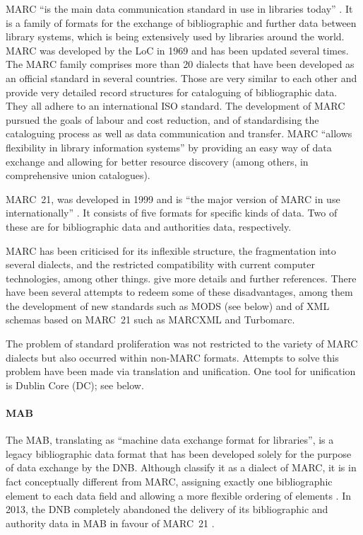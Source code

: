 \gls{MARC} \enquote{is the main data communication standard in use in libraries today}
\autocite[p.198]{Hider2008}. It is a family of formats for the exchange of bibliographic
and further data between library systems, which is being extensively used by libraries around the world. 
MARC was developed by the \gls{LoC} in 1969
and has been updated several times.
The MARC family comprises more than 20 dialects that have been developed as an official standard
in several countries.
Those are very similar to each other and provide very detailed record structures for cataloguing of bibliographic data.
They all adhere to an international \gls{ISO} standard.
The development of MARC pursued the goals of labour and cost reduction,
and of standardising the cataloguing process
as well as data communication and transfer.
MARC \enquote{allows flexibility in library information systems} \autocite[p.201]{Hider2008}
by providing an easy way of data exchange and allowing for better resource discovery (among others, in comprehensive union catalogues).

MARC~21, was developed in 1999 and is \enquote{the major version of MARC in use internationally} \autocite[p.205]{Hider2008}.
It consists of five formats for specific kinds of data.
Two of these are for bibliographic data and authorities data, respectively.

MARC has been criticised for its inflexible structure, the fragmentation into several dialects,
and the restricted compatibility with current computer technologies, among other things.
\textcite[p.212]{Hider2008} give more details and further references.
There have been several attempts to redeem some of these disadvantages,
among them the development of new standards such as MODS (see below)
and of \gls{XML} schemas based on MARC~21 such as MARCXML and Turbomarc.

The problem of standard proliferation was not restricted to the
variety of MARC dialects but also occurred within non-MARC formats.
Attempts to solve this problem have been made via
translation and unification. One tool for unification is Dublin Core (DC); see below.

\paragraph{MAB}

The \gls{MAB}, translating as \enquote{machine data exchange format for libraries},
is a legacy bibliographic data format that has been developed solely for the purpose of data exchange
by the \gls{DNB}.
Although \textcite[p.204]{Hider2008} classify it as a dialect of \gls{MARC},
it is in fact conceptually different from \gls{MARC},
assigning exactly one bibliographic element to each data field
and allowing a more flexible ordering of elements \autocite{WikiMAB}.
In 2013, the \gls{DNB} completely abandoned the delivery of its bibliographic and authority data in MAB
in favour of \gls{MARC}~21 \autocite{MAB}.

